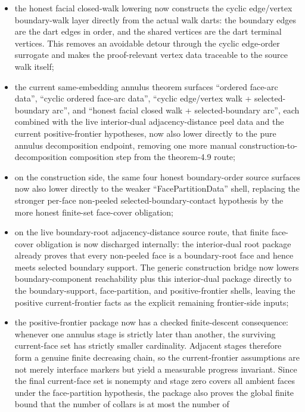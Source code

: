 \documentclass[11pt]{article}
\begin{document}
\begin{itemize}
endpoints, so future work can target actual facial walks without first
repackaging them by hand as cyclic surrogate data;
\item the honest facial closed-walk lowering now constructs the cyclic
edge/vertex boundary-walk layer directly from the actual walk darts: the
boundary edges are the dart edges in order, and the shared vertices are the
dart terminal vertices. This removes an avoidable detour through the cyclic
edge-order surrogate and makes the proof-relevant vertex data traceable to the
source walk itself;
\item the current same-embedding annulus theorem surfaces ``ordered face-arc
data'', ``cyclic ordered face-arc data'', ``cyclic edge/vertex walk +
selected-boundary arc'', and ``honest facial closed walk +
selected-boundary arc'', each combined with the live interior-dual
adjacency-distance peel data and the current positive-frontier hypotheses, now
also lower directly to the pure annulus decomposition endpoint, removing one
more manual construction-to-decomposition composition step from the theorem-4.9
route;
\item on the construction side, the same four honest boundary-order source
surfaces now also lower directly to the weaker
``FacePartitionData'' shell, replacing the stronger per-face non-peeled
selected-boundary-contact hypothesis by the more honest finite-set face-cover
obligation;
\item on the live boundary-root adjacency-distance source route, that finite
face-cover obligation is now discharged internally: the interior-dual root
package already proves that every non-peeled face is a boundary-root face and
hence meets selected boundary support. The generic construction bridge now
lowers boundary-component reachability plus this interior-dual package directly
to the boundary-support, face-partition, and positive-frontier shells, leaving
the positive current-frontier facts as the explicit remaining frontier-side
inputs;
\item the positive-frontier package now has a checked finite-descent
consequence: whenever one annulus stage is strictly later than another, the
surviving current-face set has strictly smaller cardinality. Adjacent stages
therefore form a genuine finite decreasing chain, so the current-frontier
assumptions are not merely interface markers but yield a measurable progress
invariant. Since the final current-face set is nonempty and stage zero covers
all ambient faces under the face-partition hypothesis, the package also proves
the global finite bound that the number of collars is at most the number of

\end{itemize}
\end{document}
